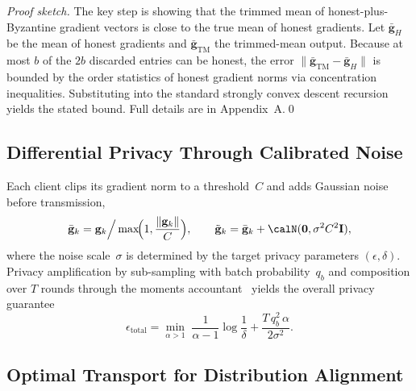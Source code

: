 \noindent\textit{Proof sketch.} The key step is showing that the trimmed mean of honest-plus-Byzantine gradient vectors is close to the true mean of honest gradients. Let $\bar{\mathbf{g}}_H$ be the mean of honest gradients and $\bar{\mathbf{g}}_{\mathrm{TM}}$ the trimmed-mean output. Because at most $b$ of the $2b$ discarded entries can be honest, the error $\|\bar{\mathbf{g}}_{\mathrm{TM}}-\bar{\mathbf{g}}_H\|$ is bounded by the order statistics of honest gradient norms via concentration inequalities. Substituting into the standard strongly convex descent recursion yields the stated bound. Full details are in Appendix~A.\qed

\subsection{Differential Privacy Through Calibrated Noise}

Each client clips its gradient norm to a threshold~$C$ and adds Gaussian noise~\cite{Abadi2016,Dwork2006,Dwork2014} before transmission,
\begin{equation}
\bar{\mathbf{g}}_k = \mathbf{g}_k\Big/\max\!\Bigl(1,\frac{\|\mathbf{g}_k\|}
{C}\Bigr),
\qquad
\tilde{\mathbf{g}}_k = \bar{\mathbf{g}}_k + \calN(\mathbf{0},\sigma^2 C^2\mathbf{I}),
\label{eq:fed_dp_noise}
\end{equation}
where the noise scale~$\sigma$ is determined by the target privacy parameters $(\epsilon,\delta)$. Privacy amplification by sub-sampling with batch probability~$q_b$ and composition over $T$ rounds through the moments accountant~\cite{Mironov2017,Balle2018} yields the overall privacy guarantee
\begin{equation}
\epsilon_{\mathrm{total}}
= \min_{\alpha>1}\;
  \frac{1}{\alpha-1}\log\frac{1}{\delta}
  + \frac{T\,q_b^2\,\alpha}{2\sigma^2}.
\label{eq:fed_privacy}
\end{equation}

\subsection{Optimal Transport for Distribution Alignment}

